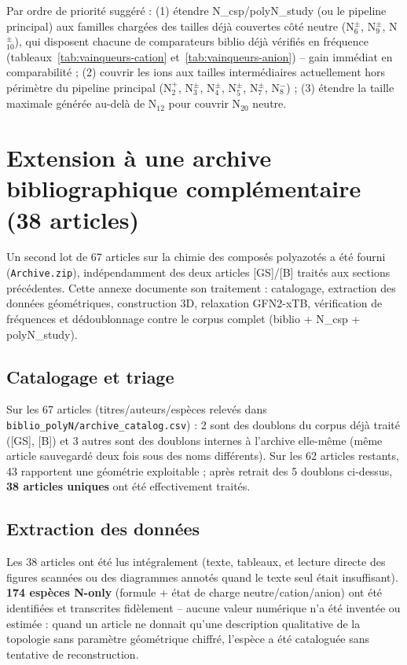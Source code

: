 \documentclass[11pt,a4paper]{article}
\begin{document}
Par ordre de priorit\'e sugg\'er\'e : (1) \'etendre N\_csp/polyN\_study (ou
le pipeline principal) aux familles charg\'ees des tailles d\'ej\`a
couvertes c\^ot\'e neutre (N$_6^\pm$, N$_9^\pm$, N$_{10}^\pm$), qui
disposent chacune de comparateurs biblio d\'ej\`a v\'erifi\'es en fr\'equence
(tableaux~\ref{tab:vainqueurs-cation} et~\ref{tab:vainqueurs-anion}) --
gain imm\'ediat en comparabilit\'e ; (2) couvrir les ions aux tailles
interm\'ediaires actuellement hors p\'erim\`etre du pipeline principal
(N$_2^{+}$, N$_3^{\pm}$, N$_4^{\pm}$, N$_5^{\pm}$, N$_7^{\pm}$, N$_8^{-}$) ;
(3) \'etendre la taille maximale g\'en\'er\'ee au-del\`a de N$_{12}$ pour
couvrir N$_{20}$ neutre.

\section{Extension \`a une archive bibliographique compl\'ementaire (38 articles)}
\label{sec:archive-extension}

Un second lot de 67 articles sur la chimie des compos\'es polyazot\'es a
\'et\'e fourni (\texttt{Archive.zip}), ind\'ependamment des deux articles
[GS]/[B] trait\'es aux sections pr\'ec\'edentes. Cette annexe documente son
traitement : catalogage, extraction des donn\'ees g\'eom\'etriques,
construction 3D, relaxation GFN2-xTB, v\'erification de fr\'equences et
d\'edoublonnage contre le corpus complet (biblio + N\_csp + polyN\_study).

\subsection{Catalogage et triage}

Sur les 67 articles (titres/auteurs/esp\`eces relev\'es dans
\texttt{biblio\_polyN/archive\_catalog.csv}) : 2 sont des doublons du
corpus d\'ej\`a trait\'e ([GS], [B]) et 3 autres sont des doublons internes
\`a l'archive elle-m\^eme (m\^eme article sauvegard\'e deux fois sous des
noms diff\'erents). Sur les 62 articles restants, 43 rapportent une
g\'eom\'etrie exploitable ; apr\`es retrait des 5 doublons ci-dessus,
\textbf{38 articles uniques} ont \'et\'e effectivement trait\'es.

\subsection{Extraction des donn\'ees}

Les 38 articles ont \'et\'e lus int\'egralement (texte, tableaux, et
lecture directe des figures scann\'ees ou des diagrammes annot\'es quand le
texte seul \'etait insuffisant). \textbf{174 esp\`eces N-only} (formule +
\'etat de charge neutre/cation/anion) ont \'et\'e identifi\'ees et
transcrites fid\`element -- aucune valeur num\'erique n'a \'et\'e
invent\'ee ou estim\'ee : quand un article ne donnait qu'une description
qualitative de la topologie sans param\`etre g\'eom\'etrique chiffr\'e,
l'esp\`ece a \'et\'e catalogu\'ee sans tentative de reconstruction.
\end{document}
